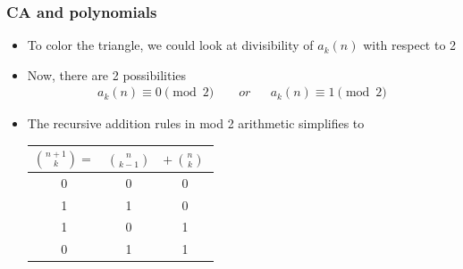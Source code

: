 \documentclass{beamer}
\begin{document}
\begin{frame}
    \frametitle{CA and polynomials}
    \begin{itemize}
        \item To color the triangle, we could look at divisibility of $a_k(n)$ with respect to 2
        \item Now, there are 2 possibilities 
        \begin{align*}
            a_k(n) \equiv 0 \pmod 2  \qquad or&& a_k(n) \equiv 1 \pmod 2
        \end{align*}
        \item The recursive addition rules in mod 2 arithmetic simplifies to
        \begin{table}
            \centering
            \begin{tabular}{|ccc|}
                \hline
                $\binom{n+1}{k} =$ & $\binom{n}{k-1}$& $+ \ \binom{n}{k} \ $\\
                \hline
                0 & 0 & 0 \\
                1 & 1 & 0 \\
                1 & 0 & 1 \\
                0 & 1 & 1 \\
                \hline
            \end{tabular}
        \end{table}
    \end{itemize}
\end{frame}
\end{document}
